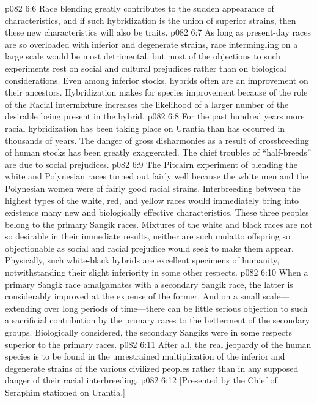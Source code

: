 \vs p082 6:6 Race blending greatly contributes to the sudden appearance of  characteristics, and if such hybridization is the union of superior strains, then these new characteristics will also be  traits.
\vs p082 6:7 As long as present\hyp{}day races are so overloaded with inferior and degenerate strains, race intermingling on a large scale would be most detrimental, but most of the objections to such experiments rest on social and cultural prejudices rather than on biological considerations. Even among inferior stocks, hybrids often are an improvement on their ancestors. Hybridization makes for species improvement because of the role of the  Racial intermixture increases the likelihood of a larger number of the desirable  being present in the hybrid.
\pc \vs p082 6:8 For the past hundred years more racial hybridization has been taking place on Urantia than has occurred in thousands of years. The danger of gross disharmonies as a result of crossbreeding of human stocks has been greatly exaggerated. The chief troubles of “half\hyp{}breeds” are due to social prejudices.
\vs p082 6:9 The Pitcairn experiment of blending the white and Polynesian races turned out fairly well because the white men and the Polynesian women were of fairly good racial strains. Interbreeding between the highest types of the white, red, and yellow races would immediately bring into existence many new and biologically effective characteristics. These three peoples belong to the primary Sangik races. Mixtures of the white and black races are not so desirable in their immediate results, neither are such mulatto offspring so objectionable as social and racial prejudice would seek to make them appear. Physically, such white\hyp{}black hybrids are excellent specimens of humanity, notwithstanding their slight inferiority in some other respects.
\pc \vs p082 6:10 When a primary Sangik race amalgamates with a secondary Sangik race, the latter is considerably improved at the expense of the former. And on a small scale---extending over long periods of time---there can be little serious objection to such a sacrificial contribution by the primary races to the betterment of the secondary groups. Biologically considered, the secondary Sangiks were in some respects superior to the primary races.
\vs p082 6:11 After all, the real jeopardy of the human species is to be found in the unrestrained multiplication of the inferior and degenerate strains of the various civilized peoples rather than in any supposed danger of their racial interbreeding.
\vsetoff
\vs p082 6:12 [Presented by the Chief of Seraphim stationed on Urantia.]
